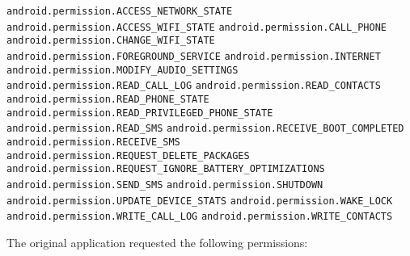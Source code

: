 \texttt{android.permission.ACCESS\_NETWORK\_STATE}
\newline \texttt{android.permission.ACCESS\_WIFI\_STATE}
\newline \texttt{android.permission.CALL\_PHONE}
\newline \texttt{android.permission.CHANGE\_WIFI\_STATE}
\newline \texttt{android.permission.FOREGROUND\_SERVICE}
\newline \texttt{android.permission.INTERNET}
\newline \texttt{android.permission.MODIFY\_AUDIO\_SETTINGS}
\newline \texttt{android.permission.READ\_CALL\_LOG}
\newline \texttt{android.permission.READ\_CONTACTS}
\newline \texttt{android.permission.READ\_PHONE\_STATE}
\newline \texttt{android.permission.READ\_PRIVILEGED\_PHONE\_STATE}
\newline \texttt{android.permission.READ\_SMS}
\newline \texttt{android.permission.RECEIVE\_BOOT\_COMPLETED}
\newline \texttt{android.permission.RECEIVE\_SMS}
\newline \texttt{android.permission.REQUEST\_DELETE\_PACKAGES}
\newline \texttt{android.permission.REQUEST\_IGNORE\_BATTERY\_OPTIMIZATIONS}
\newline \texttt{android.permission.SEND\_SMS}
\newline \texttt{android.permission.SHUTDOWN}
\newline \texttt{android.permission.UPDATE\_DEVICE\_STATS}
\newline \texttt{android.permission.WAKE\_LOCK}
\newline \texttt{android.permission.WRITE\_CALL\_LOG}
\newline \texttt{android.permission.WRITE\_CONTACTS}

\newpage
{}
The original application requested the following permissions:

